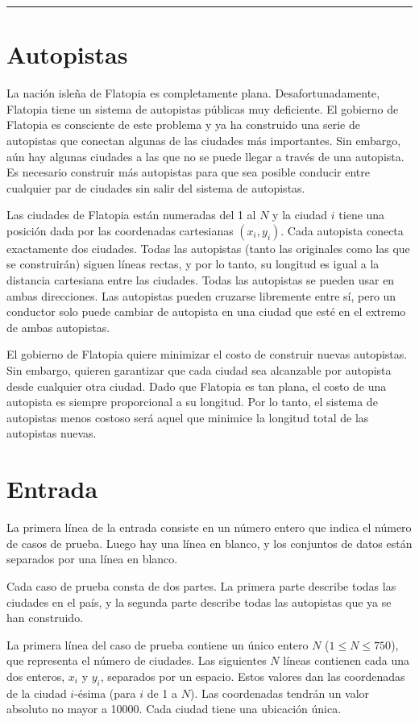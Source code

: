 \hrule
\section*{Autopistas}

La nación isleña de Flatopia es completamente plana. Desafortunadamente, Flatopia tiene un
sistema de autopistas públicas muy deficiente. El gobierno de Flatopia es consciente de
este problema y ya ha construido una serie de autopistas que conectan algunas de las
ciudades más importantes. Sin embargo, aún hay algunas ciudades a las que no se puede
llegar a través de una autopista. Es necesario construir más autopistas para que sea
posible conducir entre cualquier par de ciudades sin salir del sistema de autopistas.

Las ciudades de Flatopia están numeradas del 1 al \(N\) y la ciudad \(i\) tiene una
posición dada por las coordenadas cartesianas \((x_i, y_i)\). Cada autopista conecta
exactamente dos ciudades. Todas las autopistas (tanto las originales como las que se
construirán) siguen líneas rectas, y por lo tanto, su longitud es igual a la distancia
cartesiana entre las ciudades. Todas las autopistas se pueden usar en ambas direcciones.
Las autopistas pueden cruzarse libremente entre sí, pero un conductor solo puede cambiar
de autopista en una ciudad que esté en el extremo de ambas autopistas.

El gobierno de Flatopia quiere minimizar el costo de construir nuevas autopistas. Sin
embargo, quieren garantizar que cada ciudad sea alcanzable por autopista desde cualquier
otra ciudad. Dado que Flatopia es tan plana, el costo de una autopista es siempre
proporcional a su longitud. Por lo tanto, el sistema de autopistas menos costoso será
aquel que minimice la longitud total de las autopistas nuevas.

\section*{Entrada}

La primera línea de la entrada consiste en un número entero que indica el número de casos
de prueba. Luego hay una línea en blanco, y los conjuntos de datos están separados por una
línea en blanco.

Cada caso de prueba consta de dos partes. La primera parte describe todas las ciudades en
el país, y la segunda parte describe todas las autopistas que ya se han construido.

La primera línea del caso de prueba contiene un único entero \(N\) (\(1 \leq N \leq
750\)), que representa el número de ciudades. Las siguientes \(N\) líneas contienen cada
una dos enteros, \(x_i\) y \(y_i\), separados por un espacio. Estos valores dan las
coordenadas de la ciudad \(i\)-ésima (para \(i\) de 1 a \(N\)). Las coordenadas tendrán un
valor absoluto no mayor a 10000. Cada ciudad tiene una ubicación única.

